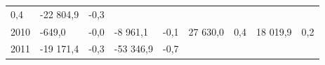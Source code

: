 \begin{longtable}[]{@{}lllllllll@{}}
\begin{minipage}[t]{0.06\columnwidth}
0,4\strut
\end{minipage} & \begin{minipage}[t]{0.09\columnwidth}\raggedright
-22 804,9\strut
\end{minipage} & \begin{minipage}[t]{0.06\columnwidth}\raggedright
-0,3\strut
\end{minipage}\tabularnewline
\begin{minipage}[t]{0.05\columnwidth}\raggedright
2010\strut
\end{minipage} & \begin{minipage}[t]{0.10\columnwidth}\raggedright
-649,0\strut
\end{minipage} & \begin{minipage}[t]{0.06\columnwidth}\raggedright
-0,0\strut
\end{minipage} & \begin{minipage}[t]{0.16\columnwidth}\raggedright
-8 961,1\strut
\end{minipage} & \begin{minipage}[t]{0.06\columnwidth}\raggedright
-0,1\strut
\end{minipage} & \begin{minipage}[t]{0.12\columnwidth}\raggedright
27 630,0\strut
\end{minipage} & \begin{minipage}[t]{0.06\columnwidth}\raggedright
0,4\strut
\end{minipage} & \begin{minipage}[t]{0.09\columnwidth}\raggedright
18 019,9\strut
\end{minipage} & \begin{minipage}[t]{0.06\columnwidth}\raggedright
0,2\strut
\end{minipage}\tabularnewline
\begin{minipage}[t]{0.05\columnwidth}\raggedright
2011\strut
\end{minipage} & \begin{minipage}[t]{0.10\columnwidth}\raggedright
-19 171,4\strut
\end{minipage} & \begin{minipage}[t]{0.06\columnwidth}\raggedright
-0,3\strut
\end{minipage} & \begin{minipage}[t]{0.16\columnwidth}\raggedright
-53 346,9\strut
\end{minipage} & \begin{minipage}[t]{0.06\columnwidth}\raggedright
-0,7\strut
\end{minipage} & \begin{minipage}[t]{0.12\columnwidth}\raggedright

\end{minipage}
\end{longtable}
